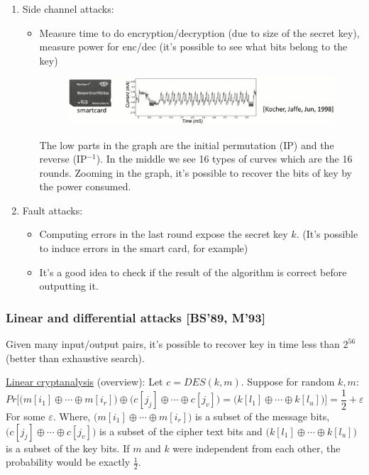 \documentclass[12pt]{book}
\begin{document}
\begin{enumerate}
	\item Side channel attacks:
	\begin{itemize}
		\item Measure time to do encryption/decryption (due to size of the secret key), measure power for enc/dec (it's possible to see what bits belong to the key)
		\begin{figure}[h]
			\centering
			\includegraphics[width=\textwidth]{smartcard}
		\end{figure}The low parts in the graph are the initial permutation (IP) and the reverse (IP$^{-1}$). In the middle we see 16 types of curves which are the 16 rounds. Zooming in the graph, it's possible to recover the bits of key by the power consumed.
	\end{itemize}
	\item Fault attacks:
	\begin{itemize}
		\item Computing errors in the last round expose the secret key $k$. (It's possible to induce errors in the smart card, for example)
		\item It's a good idea to check if the result of the algorithm is correct before outputting it.
	\end{itemize}
\end{enumerate}

\subsubsection{Linear and differential attacks [BS'89, M'93]}
Given many input/output pairs, it's possible to recover key in time less than $2^{56}$ (better than exhaustive search).

\underline{Linear cryptanalysis} (overview): Let $c=DES(k,m)$. Suppose for random $k,m$:
$$Pr\Big[\big(m[i_{1}]\oplus\cdots\oplus m[i_{r}]\big)\oplus\big(c[j_{j}]\oplus\cdots\oplus c[j_{v}]\big)=\big(k[l_{1}]\oplus\cdots\oplus k[l_{u}]\big)\Big]=\frac{1}{2}+\varepsilon$$For some $\varepsilon$. Where, $\big(m[i_{1}]\oplus\cdots\oplus m[i_{r}]\big)$ is a subset of the message bits, $\big(c[j_{j}]\oplus\cdots\oplus c[j_{v}]\big)$ is a subset of the cipher text bits and $\big(k[l_{1}]\oplus\cdots\oplus k[l_{u}]\big)$ is a subset of the key bits. If $m$ and $k$ were independent from each other, the probability would be exactly $\frac{1}{2}$.
\end{document}
